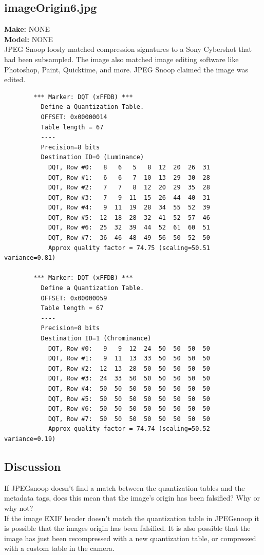 \documentclass{article}
\begin{document}
\subsection{imageOrigin6.jpg}
	\textbf{Make:} NONE\\
	\textbf{Model:} NONE\\
JPEG Snoop loosly matched compression signatures to a Sony Cybershot
that had been subsampled. The image also matched image editing software
like Photoshop, Paint, Quicktime, and more. JPEG Snoop claimed the
image was edited.
\begin{lstlisting}
		*** Marker: DQT (xFFDB) ***
		  Define a Quantization Table.
		  OFFSET: 0x00000014
		  Table length = 67
		  ----
		  Precision=8 bits
		  Destination ID=0 (Luminance)
			DQT, Row #0:   8   6   5   8  12  20  26  31 
			DQT, Row #1:   6   6   7  10  13  29  30  28 
			DQT, Row #2:   7   7   8  12  20  29  35  28 
			DQT, Row #3:   7   9  11  15  26  44  40  31 
			DQT, Row #4:   9  11  19  28  34  55  52  39 
			DQT, Row #5:  12  18  28  32  41  52  57  46 
			DQT, Row #6:  25  32  39  44  52  61  60  51 
			DQT, Row #7:  36  46  48  49  56  50  52  50 
			Approx quality factor = 74.75 (scaling=50.51 variance=0.81)
		 
		*** Marker: DQT (xFFDB) ***
		  Define a Quantization Table.
		  OFFSET: 0x00000059
		  Table length = 67
		  ----
		  Precision=8 bits
		  Destination ID=1 (Chrominance)
			DQT, Row #0:   9   9  12  24  50  50  50  50 
			DQT, Row #1:   9  11  13  33  50  50  50  50 
			DQT, Row #2:  12  13  28  50  50  50  50  50 
			DQT, Row #3:  24  33  50  50  50  50  50  50 
			DQT, Row #4:  50  50  50  50  50  50  50  50 
			DQT, Row #5:  50  50  50  50  50  50  50  50 
			DQT, Row #6:  50  50  50  50  50  50  50  50 
			DQT, Row #7:  50  50  50  50  50  50  50  50 
			Approx quality factor = 74.74 (scaling=50.52 variance=0.19)
\end{lstlisting}

\subsection{Discussion}
If JPEGsnoop doesn’t find a match between the quantization tables and the metadata tags, does this mean that the image’s origin has been falsified? Why or why not?\\
If the image EXIF header doesn't match the quantization table in JPEGsnoop
it is possible that the images origin has been falsified. It is also
possible that the image has just been recompressed with a new quantization
table, or compressed with a custom table in the camera.
\end{document}
